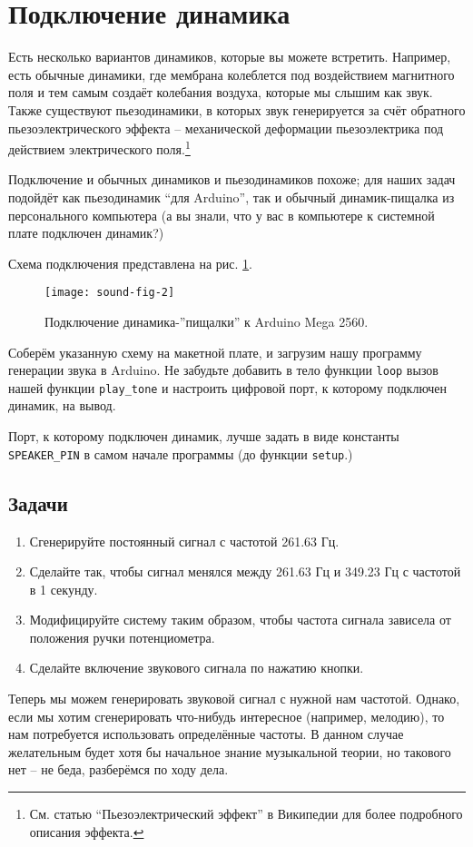 \documentclass[../sparc.tex]{subfiles}
\begin{document}
\section{Подключение динамика}

Есть несколько вариантов динамиков, которые вы можете встретить.  Например, есть
обычные динамики, где мембрана колеблется под воздействием магнитного поля и тем
самым создаёт колебания воздуха, которые мы слышим как звук.  Также существуют
пьезодинамики, в которых звук генерируется за счёт обратного пьезоэлектрического
эффекта -- механической деформации пьезоэлектрика под действием электрического
поля.\footnote{См. статью ``Пьезоэлектрический эффект'' в Википедии для более
подробного описания эффекта.}

Подключение и обычных динамиков и пьезодинамиков похоже; для наших задач
подойдёт как пьезодинамик ``для Arduino'', так и обычный динамик-пищалка из
персонального компьютера (а вы знали, что у вас в компьютере к системной плате
подключен динамик?)

Схема подключения представлена на рис. \ref{fig:sound-fig-2}.

\begin{figure}[h]
  \caption{Подключение динамика-''пищалки'' к Arduino Mega 2560.}
  \label{fig:sound-fig-2}
  \texttt{[image: sound-fig-2]}
  \centering
\end{figure}

Соберём указанную схему на макетной плате, и загрузим нашу программу генерации
звука в Arduino. Не забудьте добавить в тело функции \texttt{loop} вызов нашей
функции \texttt{play\_tone} и настроить цифровой порт, к которому подключен
динамик, на вывод.

Порт, к которому подключен динамик, лучше задать в виде константы
\texttt{SPEAKER\_PIN} в самом начале программы (до функции \texttt{setup}.)

\subsection{Задачи}
\begin{enumerate}
\item Сгенерируйте постоянный сигнал с частотой 261.63 Гц.
\item Сделайте так, чтобы сигнал менялся между 261.63 Гц и 349.23 Гц с частотой
  в 1 секунду.
\item Модифицируйте систему таким образом, чтобы частота сигнала зависела от
  положения ручки потенциометра.
\item Сделайте включение звукового сигнала по нажатию кнопки.
\end{enumerate}

Теперь мы можем генерировать звуковой сигнал с нужной нам частотой.  Однако,
если мы хотим сгенерировать что-нибудь интересное (например, мелодию), то нам
потребуется использовать определённые частоты.  В данном случае желательным
будет хотя бы начальное знание музыкальной теории, но такового нет -- не беда,
разберёмся по ходу дела.
\end{document}
